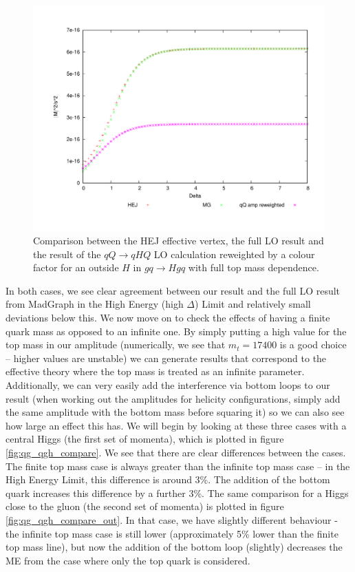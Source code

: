 \begin{figure}[t]
\centering
\includegraphics[scale=0.5]{Images/qg_qgH_outside.pdf}
\caption{Comparison between the HEJ effective vertex, the full LO result and the result of the $qQ \to qHQ$ LO calculation reweighted by a colour factor for an outside $H$ in $gq \to Hgq$ with full top mass dependence.}
\label{fig:gu_ghu_out}
\end{figure}
In both cases, we see clear agreement between our result and the full LO result from MadGraph in the High Energy (high $\Delta$) Limit and relatively small deviations below this. We now move on to check the effects of having a finite quark mass as opposed to an infinite one. By simply putting a high value for the top mass in our amplitude (numerically, we see that $m_t = 17400$ is a good choice -- higher values are unstable) we can generate results that correspond to the effective theory where the top mass is treated as an infinite parameter. Additionally, we can very easily add the interference via bottom loops to our result (when working out the amplitudes for helicity configurations, simply add the same amplitude with the bottom mass before squaring it) so we can also see how large an effect this has. We will begin by looking at these three cases with a central Higgs (the first set of momenta), which is plotted in figure \ref{fig:qg_qgh_compare}. We see that there are clear differences between the cases. The finite top mass case is always greater than the infinite top mass case -- in the High Energy Limit, this difference is around 3\%. The addition of the bottom quark increases this difference by a further 3\%. The same comparison for a Higgs close to the gluon (the second set of momenta) is plotted in figure \ref{fig:qg_qgh_compare_out}. In that case, we have slightly different behaviour - the infinite top mass case is still lower (approximately 5\% lower than the finite top mass line), but now the addition of the bottom loop (slightly) decreases the ME from the case where only the top quark is considered. 

